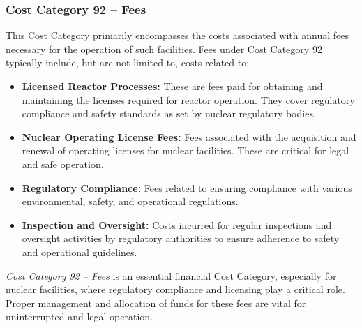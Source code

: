 \subsubsection*{Cost Category 92 – Fees}
This Cost Category primarily encompasses the costs associated with annual fees necessary for the operation of such facilities.  Fees under Cost Category 92 typically include, but are not limited to, costs related to:

\begin{itemize}
    \item \textbf{Licensed Reactor Processes:} These are fees paid for obtaining and maintaining the licenses required for reactor operation. They cover regulatory compliance and safety standards as set by nuclear regulatory bodies.
    \item \textbf{Nuclear Operating License Fees:} Fees associated with the acquisition and renewal of operating licenses for nuclear facilities. These are critical for legal and safe operation.
    \item \textbf{Regulatory Compliance:} Fees related to ensuring compliance with various environmental, safety, and operational regulations.
    \item \textbf{Inspection and Oversight:} Costs incurred for regular inspections and oversight activities by regulatory authorities to ensure adherence to safety and operational guidelines.
\end{itemize}

\textit{Cost Category 92 – Fees} is an essential financial Cost Category, especially for nuclear facilities, where regulatory compliance and licensing play a critical role. Proper management and allocation of funds for these fees are vital for uninterrupted and legal operation.

